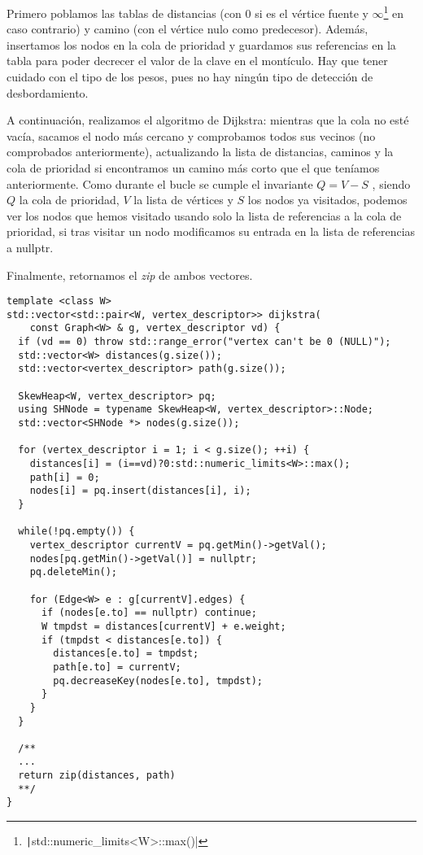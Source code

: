 \documentclass{article}
\begin{document}
Primero poblamos las tablas de distancias (con 0 si es el vértice fuente y $\infty$\footnote{\texttt|std::numeric_limits<W>::max()|} en caso contrario) y camino (con el vértice nulo como predecesor). Además, insertamos los nodos en la cola de prioridad y guardamos sus referencias en la tabla para poder decrecer el valor de la clave en el montículo. Hay que tener cuidado con el tipo de los pesos, pues no hay ningún tipo de detección de desbordamiento.

A continuación, realizamos el algoritmo de Dijkstra: mientras que la cola no esté vacía, sacamos el nodo más cercano y comprobamos todos sus vecinos (no comprobados anteriormente), actualizando la lista de distancias, caminos y la cola de prioridad si encontramos un camino más corto que el que teníamos anteriormente. Como durante el bucle se cumple el invariante $Q = V - S$ \cite{CormenDijsktra}, siendo $Q$ la cola de prioridad, $V$ la lista de vértices y $S$ los nodos ya visitados, podemos ver los nodos que hemos visitado usando solo la lista de referencias a la cola de prioridad, si tras visitar un nodo modificamos su entrada en la lista de referencias a nullptr.

Finalmente, retornamos el \textit{zip} de ambos vectores.

\begin{verbatim}
template <class W>
std::vector<std::pair<W, vertex_descriptor>> dijkstra(
	const Graph<W> & g, vertex_descriptor vd) {
  if (vd == 0) throw std::range_error("vertex can't be 0 (NULL)");
  std::vector<W> distances(g.size());
  std::vector<vertex_descriptor> path(g.size());

  SkewHeap<W, vertex_descriptor> pq;
  using SHNode = typename SkewHeap<W, vertex_descriptor>::Node;
  std::vector<SHNode *> nodes(g.size());

  for (vertex_descriptor i = 1; i < g.size(); ++i) {
    distances[i] = (i==vd)?0:std::numeric_limits<W>::max();
    path[i] = 0;
    nodes[i] = pq.insert(distances[i], i);
  }

  while(!pq.empty()) {
    vertex_descriptor currentV = pq.getMin()->getVal();
    nodes[pq.getMin()->getVal()] = nullptr;
    pq.deleteMin();

    for (Edge<W> e : g[currentV].edges) {
      if (nodes[e.to] == nullptr) continue;
      W tmpdst = distances[currentV] + e.weight;
      if (tmpdst < distances[e.to]) {
        distances[e.to] = tmpdst;
        path[e.to] = currentV;
        pq.decreaseKey(nodes[e.to], tmpdst);
      }
    }
  }

  /**
  ...
  return zip(distances, path)
  **/
}
\end{verbatim}
\end{document}
